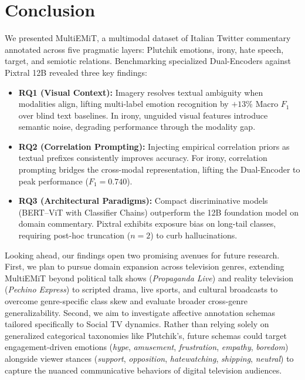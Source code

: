 \section{Conclusion}
\label{sec:conclusion}

We presented MultiEMiT, a multimodal dataset of Italian Twitter commentary annotated across five pragmatic layers: Plutchik emotions, irony, hate speech, target, and semiotic relations. Benchmarking specialized Dual-Encoders against Pixtral 12B revealed three key findings:
\begin{itemize}
    \item \textbf{RQ1 (Visual Context):} Imagery resolves textual ambiguity when modalities align, lifting multi-label emotion recognition by $+13$\% Macro $F_1$ over blind text baselines. In irony, unguided visual features introduce semantic noise, degrading performance through the modality gap.
    \item \textbf{RQ2 (Correlation Prompting):} Injecting empirical correlation priors as textual prefixes consistently improves accuracy. For irony, correlation prompting bridges the cross-modal representation, lifting the Dual-Encoder to peak performance ($F_1 = 0.740$).
    \item \textbf{RQ3 (Architectural Paradigms):} Compact discriminative models (BERT--ViT with Classifier Chains) outperform the 12B foundation model on domain commentary. Pixtral exhibits exposure bias on long-tail classes, requiring post-hoc truncation ($n=2$) to curb hallucinations.
\end{itemize}

Looking ahead, our findings open two promising avenues for future research. First, we plan to pursue domain expansion across television genres, extending MultiEMiT beyond political talk shows (\textit{Propaganda Live}) and reality television (\textit{Pechino Express}) to scripted drama, live sports, and cultural broadcasts to overcome genre-specific class skew and evaluate broader cross-genre generalizability. Second, we aim to investigate affective annotation schemas tailored specifically to Social TV dynamics. Rather than relying solely on generalized categorical taxonomies like Plutchik's, future schemas could target engagement-driven emotions (\textit{hype}, \textit{amusement}, \textit{frustration}, \textit{empathy}, \textit{boredom}) alongside viewer stances (\textit{support}, \textit{opposition}, \textit{hatewatching}, \textit{shipping}, \textit{neutral}) to capture the nuanced communicative behaviors of digital television audiences.
